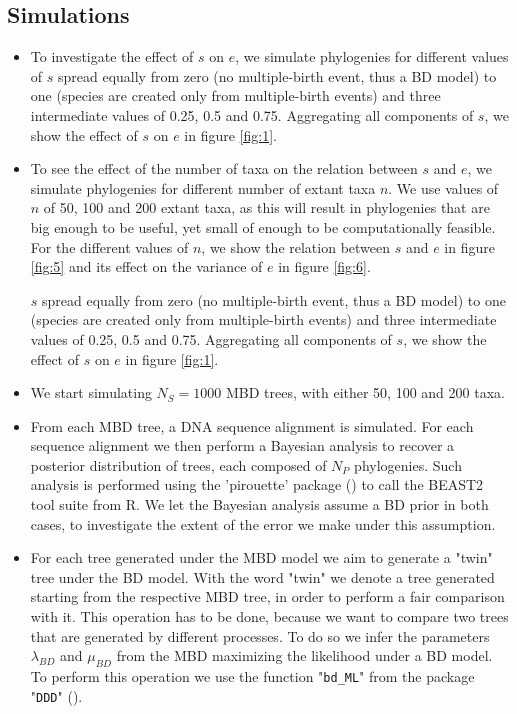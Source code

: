 \documentclass{article}
\begin{document}
\subsection{Simulations}
\begin{itemize}

\item To investigate the effect of $s$ on $e$, we simulate phylogenies
for different values of $s$ spread equally from zero (no multiple-birth
event, thus a BD model) to one (species are created only from multiple-birth
events) and three intermediate values of 0.25, 0.5 and 0.75. Aggregating all
components of $s$, we show the effect of $s$ on $e$ in figure \ref{fig:1}.

\item To see the effect of the number of taxa on the relation 
between $s$ and $e$, we simulate phylogenies
for different number of extant taxa $n$. We use values of $n$
of 50, 100 and 200 extant taxa, as this will result in phylogenies
that are big enough to be useful, yet small of enough to
be computationally feasible. For the different values of $n$, we show
the relation between $s$ and $e$ in figure \ref{fig:5} and its effect
on the variance of $e$ in figure \ref{fig:6}.
  
$s$ spread equally from zero (no multiple-birth
event, thus a BD model) to one (species are created only from multiple-birth
events) and three intermediate values of 0.25, 0.5 and 0.75. Aggregating all
components of $s$, we show the effect of $s$ on $e$ in figure \ref{fig:1}.

\item We start simulating $N_{S} = 1000$ MBD trees,
with either 50, 100 and 200 taxa.

\item From each MBD tree, a DNA sequence alignment is simulated. 
For each sequence alignment we then perform a Bayesian analysis 
to recover a posterior distribution of trees, 
each composed of $N_{P}$ phylogenies. 
Such analysis is performed using 
the 'pirouette' package (\cite{pirouette}) to call the BEAST2 tool 
suite from R. 
We let the Bayesian analysis assume a BD prior in both cases, 
to investigate the extent of the error we make under this assumption.

\item For each tree generated under the MBD model 
we aim to generate a "twin" tree under the BD model. 
With the word "twin" 
we denote a tree generated starting from the respective MBD tree, 
in order to perform a fair comparison with it. 
This operation has to be done, 
because we want to compare two trees 
that are generated by different processes. 
To do so we infer the parameters $\lambda_{BD}$ and $\mu_{BD}$ 
from the MBD maximizing the likelihood under a BD model. 
To perform this operation we use the function "\texttt{bd\_ML}" 
from the package "\texttt{DDD}" (\cite{etienne2012diversity}). 


\end{itemize}
\end{document}
